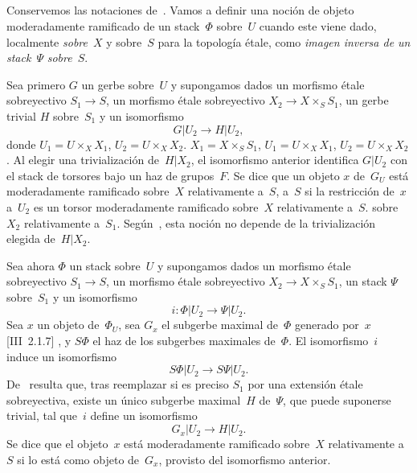
\begingroup
\shorthandoff{<>}%
\subsection{}
\label{XIII.2.2}
Conservemos las notaciones de~. Vamos a definir una noción de
objeto moderadamente ramificado de un stack~$\Phi$ sobre~$U$ cuando este viene
dado, localmente \emph{sobre}~$X$ y sobre~$S$ para la topología étale, como
\emph{imagen inversa de un stack}~$\Psi$ \emph{sobre}~$S$.

Sea primero $G$ un gerbe sobre~$U$ y supongamos dados un morfismo étale
sobreyectivo $S_1\to S$, un morfismo étale sobreyectivo
$X_2\to X\times_S S_1$, un gerbe trivial $H$ sobre~$S_1$ y un isomorfismo
$$
G|{U_2}\to H|{U_2},
$$
donde
{$U_1=U\times_X X_1$, $U_2=U\times_X X_2$.}
{$X_1=X\times_S S_1$, $U_1=U\times_X X_1$,
$U_2=U\times_X X_2$.}
Al elegir una trivialización de~$H|{X_2}$, el isomorfismo anterior identifica
$G|{U_2}$ con el stack de torsores bajo un haz de grupos~$F$. Se dice que un
objeto $x$ de~$G_U$ está moderadamente ramificado sobre~$X$ relativamente
{a~$S$,}
{a~$S$}
si la restricción de~$x$ a~$U_2$ es un torsor moderadamente ramificado
{sobre~$X$ relativamente a~$S$.}
{sobre~$X_2$ relativamente a~$S_1$.}
Según~, esta noción no depende de la trivialización elegida
de~$H|X_2$.

Sea ahora $\Phi$ un stack sobre~$U$ y supongamos dados un morfismo étale
sobreyectivo $S_1\to S$, un morfismo étale sobreyectivo
$X_2\to X\times_S S_1$, un stack $\Psi$ sobre~$S_1$ y un isomorfismo
$$
i\colon \Phi|U_2\to \Psi|U_2.
$$
Sea $x$ un objeto de~$\Phi_U$, sea $G_x$ el subgerbe maximal de~$\Phi$
generado por~$x$
{[III~2.1.7]}
{\cite[III~2.1.7]{XIII.1}},
y $S\Phi$ el haz de los subgerbes maximales de~$\Phi$. El isomorfismo~$i$
induce un isomorfismo
$$
S\Phi|U_2\to S\Psi|U_2.
$$
De~ resulta que, tras reemplazar si es preciso $S_1$ por una
extensión étale sobreyectiva, existe un único subgerbe maximal~$H$ de~$\Psi$,
que puede suponerse trivial, tal que~$i$ define un isomorfismo
$$
G_x|U_2\to H|U_2.
$$
Se dice que el objeto~$x$ está moderadamente ramificado sobre~$X$
relativamente a~$S$ si lo está como objeto de~$G_x$, provisto del
isomorfismo anterior.

